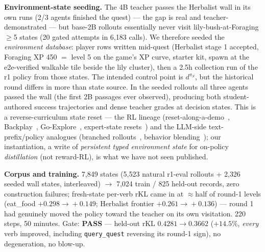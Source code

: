 \documentclass[11pt]{article}
\begin{document}
\textbf{Environment-state seeding.} The 4B teacher passes the Herbalist wall in its own
runs (2/3 agents finished the quest) --- the gap is real and teacher-demonstrated --- but
base-2B rollouts essentially never visit lily-bush-at-Foraging$\ge$5 states (20 gated attempts
in 6{,}183 calls). We therefore seeded the \emph{environment database}: player rows written
mid-quest (Herbalist stage 1 accepted, Foraging XP 450 $=$ level 5 on the game's XP curve,
starter kit, spawn at the e2e-verified walkable tile beside the lily cluster), then a 2.5h
collection run of the r1 policy from those states. The intended control point is $d^{\pi_S}$, but
the historical round differs in more than state source. In the seeded rollouts all
three agents passed the wall (the first 2B passages ever observed), producing both
student-authored success trajectories and dense teacher grades at decision states. This is a
reverse-curriculum state reset --- the RL lineage (reset-along-a-demo~\cite{salchen},
Backplay~\cite{backplay}, Go-Explore~\cite{goexplore}, expert-state resets~\cite{reset5050}) and
the LLM-side text-prefix/policy analogues (branched rollouts~\cite{bread}, behavior
blending~\cite{trb}); our instantiation, a write of \emph{persistent typed environment state} for
on-policy \emph{distillation} (not reward-RL), is what we have not seen published.

\textbf{Corpus and training.} 7{,}849 states (5{,}523 natural r1-eval rollouts + 2{,}326 seeded
wall states, interleaved) $\rightarrow$ 7{,}024 train / 825 held-out records, zero construction
failures; fresh-state per-verb rKL came in at $\approx$half of round-1 levels (eat\_food
$+0.298\!\rightarrow\!+0.149$; Herbalist frontier $+0.261\!\rightarrow\!+0.136$) --- round 1 had
genuinely moved the policy toward the teacher on its own visitation. 220 steps, 50 minutes.
Gate: \textbf{PASS} --- held-out rKL $0.4281 \rightarrow 0.3662$ ($+14.5\%$, \emph{every} verb
improved, including \texttt{query\_quest} reversing its round-1 sign), no degeneration, no
blow-up.
\end{document}

